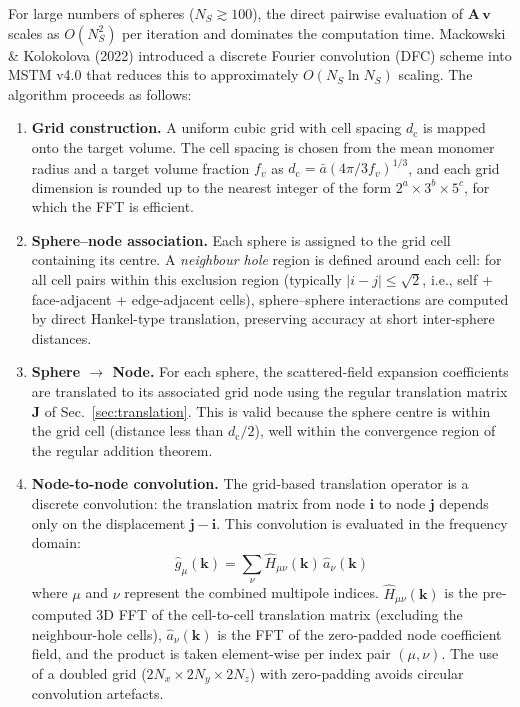 \documentclass[11pt,a4paper]{article}
\begin{document}
For large numbers of spheres ($N_S \gtrsim 100$), the direct pairwise evaluation of $\mathbf{A}\,\bm{v}$ scales as $O(N_S^2)$ per iteration and dominates the computation time.
Mackowski \& Kolokolova (2022) introduced a discrete Fourier convolution (DFC) scheme into MSTM v4.0 that reduces this to approximately $O(N_S \ln N_S)$ scaling.
The algorithm proceeds as follows:

\begin{enumerate}[nosep]
  \item \textbf{Grid construction.}
  A uniform cubic grid with cell spacing $d_\mathrm{c}$ is mapped onto the target volume.
  The cell spacing is chosen from the mean monomer radius and a target volume fraction $f_v$ as $d_\mathrm{c} = \bar{a} \left(4\pi / 3 f_v\right)^{1/3}$, and each grid dimension is rounded up to the nearest integer of the form $2^a \times 3^b \times 5^c$, for which the FFT is efficient.

  \item \textbf{Sphere--node association.}
  Each sphere is assigned to the grid cell containing its centre.
  A \emph{neighbour hole} region is defined around each cell: for all cell pairs within this exclusion region (typically $|i - j| \leq \sqrt{2}$, i.e., self + face-adjacent + edge-adjacent cells), sphere--sphere interactions are computed by direct Hankel-type translation, preserving accuracy at short inter-sphere distances.

  \item \textbf{Sphere $\to$ Node.}
  For each sphere, the scattered-field expansion coefficients are translated to its associated grid node using the regular translation matrix $\mathbf{J}$ of Sec.~\ref{sec:translation}.
  This is valid because the sphere centre is within the grid cell (distance less than $d_\mathrm{c}/2$), well within the convergence region of the regular addition theorem.

  \item \textbf{Node-to-node convolution.}
  The grid-based translation operator is a discrete convolution: the translation matrix from node $\bm{i}$ to node $\bm{j}$ depends only on the displacement $\bm{j} - \bm{i}$.
  This convolution is evaluated in the frequency domain:
  \begin{equation}
    \hat{g}_\mu(\bm{k}) = \sum_\nu \hat{H}_{\mu\nu}(\bm{k})\,\hat{a}_\nu(\bm{k})
    \label{eq:fft-convolution}
  \end{equation}
  where $\mu$ and $\nu$ represent the combined multipole indices.
  $\hat{H}_{\mu\nu}(\bm{k})$ is the pre-computed 3D FFT of the cell-to-cell translation matrix (excluding the neighbour-hole cells), $\hat{a}_\nu(\bm{k})$ is the FFT of the zero-padded node coefficient field, and the product is taken element-wise per index pair $(\mu, \nu)$.
  The use of a doubled grid ($2N_x \times 2N_y \times 2N_z$) with zero-padding avoids circular convolution artefacts.


\end{enumerate}
\end{document}
